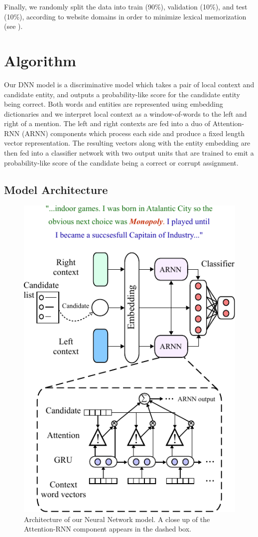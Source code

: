 \documentclass[11pt]{article}
\begin{document}
	Finally, we randomly split the data into train (90\%), validation (10\%), and test (10\%), according to website domains in order to minimize lexical memorization (see \cite{levy2015supervised}).
	
	
	\section{Algorithm}
	
	Our DNN model is a discriminative model which takes a pair of local context and candidate entity, and outputs a probability-like score for the candidate entity being correct. Both words and entities are represented using embedding dictionaries and we interpret local context as a window-of-words to the left and right of a mention. The left and right contexts are fed into a duo of Attention-RNN (ARNN) components which process each side and produce a fixed length vector representation. The resulting vectors along with the entity embedding are then fed into a classifier network with two output units that are trained to emit a probability-like score of the candidate being a correct or corrupt assignment. 
	
	\subsection{Model Architecture}
	
	\begin{figure}
		\centering
		\includegraphics[scale=1]{diagrams/model_color_v4.pdf}
		\caption{Architecture of our Neural Network model. A close up of the Attention-RNN component appears in the dashed box.}
		\label{fig:arnn}
	\end{figure}	
	
\end{document}
